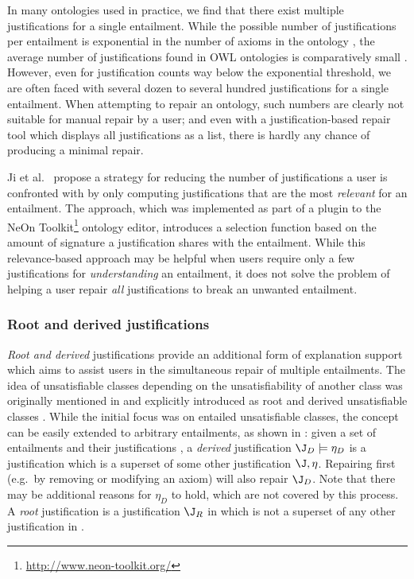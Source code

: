 In many ontologies used in practice, we find that there exist multiple justifications for a single entailment. While the possible number of justifications per entailment is exponential in the number of axioms in the ontology \cite{baader07xp}, the average number of justifications found in OWL ontologies is comparatively small \cite{bail11jm}. However, even for justification counts way below the exponential threshold, we are often faced with several dozen to several hundred justifications for a single entailment. When attempting to repair an ontology, such numbers are clearly not suitable for manual repair by a user; and even with a justification-based repair tool which displays all justifications as a list, there is hardly any chance of producing a minimal repair.

Ji et al.\ \cite{ji08en} propose a strategy for reducing the number of justifications a user is confronted with by only computing justifications that are the most \emph{relevant} for an entailment. The approach, which was implemented as part of a plugin to the NeOn Toolkit\footnote{\url{http://www.neon-toolkit.org/}} ontology editor, introduces a selection function based on the amount of signature a justification shares with the entailment. While this relevance-based approach may be helpful when users require only a few justifications for \emph{understanding} an entailment, it does not solve the problem of helping a user repair \emph{all} justifications to break an unwanted entailment.

\subsubsection{Root and derived justifications}
\label{sec:rootderived}

\emph{Root and derived} justifications provide an additional form of explanation support which aims to assist users in the simultaneous repair of multiple entailments. The idea of unsatisfiable classes depending on the unsatisfiability of another class was originally mentioned in \cite{schlobach05tf} and explicitly introduced as root and derived unsatisfiable classes \cite{kalyanpur05mi}. While the initial focus was on entailed unsatisfiable classes, the concept can be easily extended to arbitrary entailments, as shown in \cite{meyer10vd}: given a set of entailments \entset and their justifications \justs, a \emph{derived} justification $\J_{D} \models \eta_{D}$ is a justification which is a superset of some other justification $\J, \eta$. Repairing \J first (e.g.\ by removing or modifying an axiom) will also repair $\J_{D}$. Note that there may be additional reasons for $\eta_{D}$ to hold, which are not covered by this process. A \emph{root} justification is a justification $\J_{R}$ in \justs which is not a superset of any other justification in \justs.

